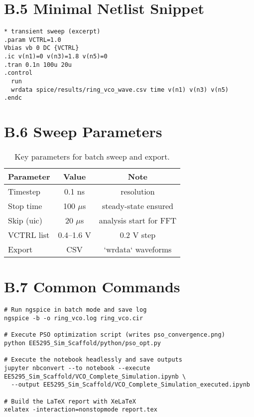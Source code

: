 \section*{B.5 Minimal Netlist Snippet}
\begin{lstlisting}[style=codespice, caption={Transient sweep excerpt (SPICE)}]
* transient sweep (excerpt)
.param VCTRL=1.0
Vbias vb 0 DC {VCTRL}
.ic v(n1)=0 v(n3)=1.8 v(n5)=0
.tran 0.1n 100u 20u
.control
  run
  wrdata spice/results/ring_vco_wave.csv time v(n1) v(n3) v(n5)
.endc
\end{lstlisting}

\section*{B.6 Sweep Parameters}
\begin{table}[H]
  \centering
  \begin{tabular}{lcc}
    \toprule
    Parameter & Value & Note \\
    \midrule
    Timestep & 0.1 ns & resolution \\
    Stop time & 100 \(\mu\)s & steady-state ensured \\
    Skip (uic) & 20 \(\mu\)s & analysis start for FFT \\
    VCTRL list & 0.4--1.6 V & 0.2 V step \\
    Export & CSV & `wrdata` waveforms \\
    \bottomrule
  \end{tabular}
  \caption{Key parameters for batch sweep and export.}
\end{table}

\section*{B.7 Common Commands}
\begin{lstlisting}[style=codebash, caption={Batch ngspice, PSO, notebook, and LaTeX build}]
# Run ngspice in batch mode and save log
ngspice -b -o ring_vco.log ring_vco.cir

# Execute PSO optimization script (writes pso_convergence.png)
python EE5295_Sim_Scaffold/python/pso_opt.py

# Execute the notebook headlessly and save outputs
jupyter nbconvert --to notebook --execute EE5295_Sim_Scaffold/VCO_Complete_Simulation.ipynb \
  --output EE5295_Sim_Scaffold/VCO_Complete_Simulation_executed.ipynb

# Build the LaTeX report with XeLaTeX
xelatex -interaction=nonstopmode report.tex
\end{lstlisting}

